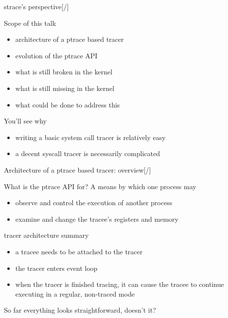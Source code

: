 \documentclass[unicode,aspectratio=169,xcolor={table,dvipsnames,usenames}]{beamer}
\begin{document}
\begin{frame}{\Large strace's perspective\hfill [\insertframenumber/\inserttotalframenumber]}
\Large
\begin{block}{Scope of this talk}
\begin{itemize}
	\item architecture of a ptrace based tracer
	\item evolution of the ptrace API
	\item what is still broken in the kernel
	\item what is still missing in the kernel
	\item what could be done to address this
\end{itemize}
\end{block}

\begin{block}{You'll see why}
\begin{itemize}
	\item writing a basic system call tracer is relatively easy
	\item a decent syscall tracer is necessarily complicated
\end{itemize}
\end{block}
\end{frame}

\begin{frame}{\Large Architecture of a ptrace based tracer: overview\hfill [\insertframenumber/\inserttotalframenumber]}
\Large
\begin{block}{What is the ptrace API for?}
A means by which one process may
\begin{itemize}
	\item observe and control the execution of another process
	\item examine and change the tracee's registers and memory
\end{itemize}
\end{block}

\begin{block}{tracer architecture summary}
\begin{itemize}
	\item a tracee needs to be attached to the tracer
	\item the tracer enters event loop
	\item when the tracer is finished tracing, it can cause the tracee
		to continue executing in a regular, non-traced mode
\end{itemize}
\end{block}

So far everything looks straightforward, doesn't it?
\end{frame}
\end{document}
